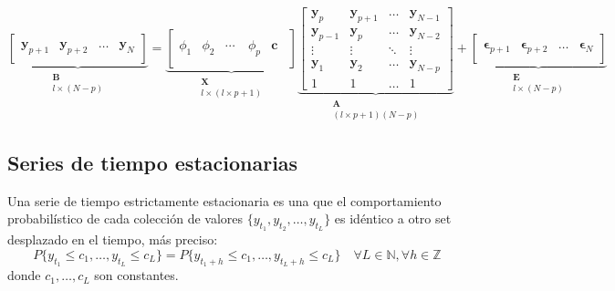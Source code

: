 \begin{equation}
 \label{eq:varmatrix}
               \underbrace{ \begin{bmatrix}
               \quad \\
               \mathbf{y}_{p+1} &
               \mathbf{y}_{p+2} &
               \dots & 
               \mathbf{y}_N \\
               \quad
               \end{bmatrix}}_{\substack{ \mathbf{B}\\l \times (N-p)}}   
= 
                \underbrace{\left[ 
                \begin{array}{ccccc}
                \quad & \quad & \quad & \quad & \quad \\
                \phi_1  & \phi_2 & \cdots & \phi_p & \mathbf{c} \\  
                \quad &\quad & \quad & \quad & \quad
               \end{array} 
               \right]}_{\substack{ \mathbf{X}\\ l \times (l \times p + 1 )}}
\underbrace{\begin{bmatrix}
   \mathbf{y}_{p}  & \mathbf{y}_{p+1} & \dots    & \mathbf{y}_{N-1}\\
   \mathbf{y}_{p-1}  & \mathbf{y}_{p} & \dots    & \mathbf{y}_{N-2}\\
   \vdots        & \vdots   & \ddots   & \vdots\\
   \mathbf{y}_{1} & \mathbf{y}_{2}   & \dots    & \mathbf{y}_{N-p}\\
   1 & 1   & \dots    & 1 
   \end{bmatrix}}_{\substack{ \mathbf{A}\\ (l\times p +1 )(N-p)}}
+
\underbrace{\begin{bmatrix}
                \quad \\
              \mathbf{\epsilon}_{p+1}  & 
              \mathbf{\epsilon}_{p+2}  & 
              \dots                & 
              \mathbf{\epsilon}_N \\
              \quad
             \end{bmatrix}}_{\substack{\mathbf{E}\\l \times (N-p) }} 
\end{equation}

\subsection{Series de tiempo estacionarias}
Una serie de tiempo estrictamente estacionaria es una que el comportamiento
probabilístico de cada colección de valores $\{y_{t_1},y_{t_2},\dots,y_{t_L}\}$
es idéntico
a otro set desplazado en el tiempo, más preciso: \[ P\{y_{t_1} \leq
c_1,\dots,y_{t_L} \leq c_L\} = P\{y_{t_1+h} \leq c_1,\dots,y_{t_L+h}
\leq c_L\}
\quad \forall L \in \mathbb{N}, \forall h \in \mathbb{Z}\] \noindent donde
$c_1,\dots,c_L$ son constantes.

